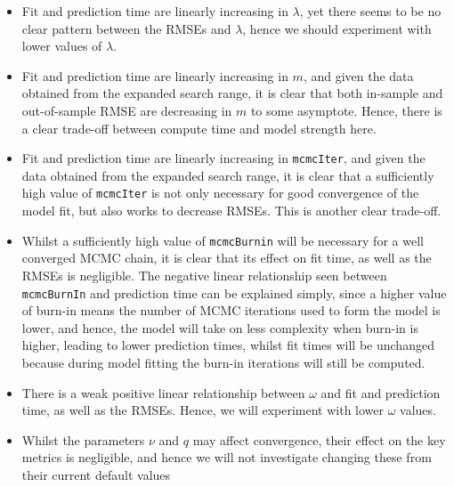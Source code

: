 \documentclass[10pt]{article}
\begin{document}
\begin{itemize}
\item Fit and prediction time are linearly increasing in $\lambda$, yet there seems to be no clear pattern between the RMSEs and $\lambda$, hence we should experiment with lower values of $\lambda$.
\item Fit and prediction time are linearly increasing in $m$, and given the data obtained from the expanded search range, it is clear that both in-sample and out-of-sample RMSE are decreasing in $m$ to some asymptote. Hence, there is a clear trade-off between compute time and model strength here.
\item Fit and prediction time are linearly increasing in \texttt{mcmcIter}, and given the data obtained from the expanded search range, it is clear that a sufficiently high value of \texttt{mcmcIter} is not only necessary for good convergence of the model fit, but also works to decrease RMSEs. This is another clear trade-off.
\item Whilst a sufficiently high value of \texttt{mcmcBurnin} will be necessary for a well converged MCMC chain, it is clear that its effect on fit time, as well as the RMSEs is negligible. The negative linear relationship seen between \texttt{mcmcBurnIn} and prediction time can be explained simply, since a higher value of burn-in means the number of MCMC iterations used to form the model is lower, and hence, the model will take on less complexity when burn-in is higher, leading to lower prediction times, whilst fit times will be unchanged because during model fitting the burn-in iterations will still be computed.
\item There is a weak positive linear relationship between $\omega$ and fit and prediction time, as well as the RMSEs. Hence, we will experiment with lower $\omega$ values.
\item Whilst the parameters $\nu$ and $q$ may affect convergence, their effect on the key metrics is negligible, and hence we will not investigate changing these from their current default values
\end{itemize}
\end{document}
